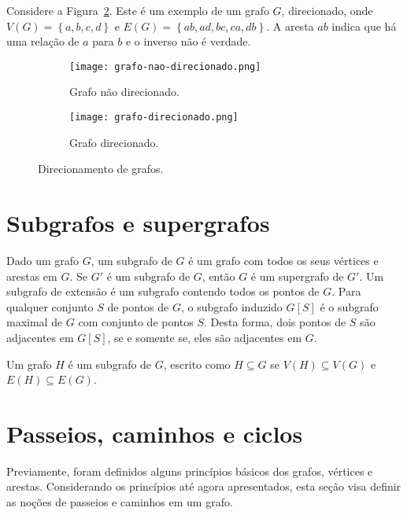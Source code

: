 Considere a Figura~\ref{sec2:ex-grafo-direcionado}. Este é um exemplo de um grafo $G$, direcionado, onde $V(G) = \left\{a, b, c, d\right\} $ e $E(G) = \left\{ab, ad, bc, ca, db\right\} $. A aresta $ab$ indica que há uma relação de $a$ para $b$ e o inverso não é verdade.

\begin{figure}[!htb]
    \centering
    \begin{subfigure}{.5\textwidth}
        \centering
        \texttt{[image: grafo-nao-direcionado.png]}
        \caption{Grafo não direcionado.}
        \label{sec2:ex-grafo-nao-direcionado}
    \end{subfigure}%
    \begin{subfigure}{.5\textwidth}
        \centering
        \texttt{[image: grafo-direcionado.png]}
        \caption{Grafo direcionado.}
        \label{sec2:ex-grafo-direcionado}
    \end{subfigure}
    \caption{Direcionamento de grafos.}
    \label{sec2:direcionamento_grafos}
\end{figure}

\section{Subgrafos e supergrafos}
Dado um grafo $G$, um subgrafo de $G$ é um grafo com todos os seus vértices e arestas em $G$. Se $G'$ é um subgrafo de $G$, então $G$ é um supergrafo de $G'$. Um subgrafo de extensão é um subgrafo contendo todos os pontos de $G$. Para qualquer conjunto $S$ de pontos de $G$, o subgrafo induzido $G[S]$ é o subgrafo maximal de $G$ com conjunto de pontos $S$. Desta forma, dois pontos de $S$ são adjacentes em $G[S]$, se e somente se, eles são adjacentes em $G$.

\begin{definition}
    Um grafo $H$ é um subgrafo de $G$, escrito como $H\subseteq G$ se $V(H) \subseteq V(G)$ e $E(H) \subseteq E(G)$.
\end{definition}

\section{Passeios, caminhos e ciclos}
Previamente, foram definidos alguns princípios básicos dos grafos, vértices e arestas. Considerando os princípios até agora apresentados, esta seção visa definir as noções de passeios e caminhos em um grafo.

